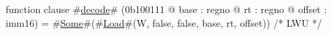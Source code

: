 function clause #\hyperref[zdecode]{decode}# (0b100111 @ base : regno @ rt : regno @ offset : imm16) =
  #\hyperref[zSome]{Some}#(#\hyperref[zLoad]{Load}#(W, false, false, base, rt, offset)) /* LWU */
